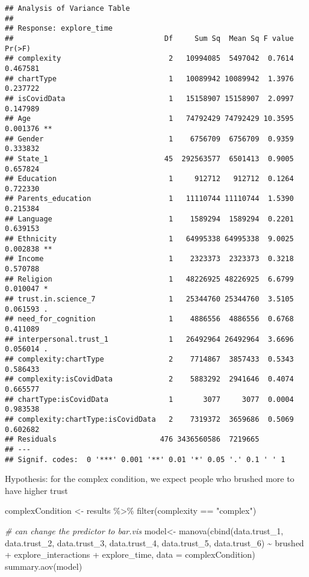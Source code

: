 \documentclass[
]{article}
\newenvironment{Shaded}{\begin{snugshade}}{\end{snugshade}}
\newcommand{\AttributeTok}[1]{\textcolor[rgb]{0.77,0.63,0.00}{#1}}
\newcommand{\CommentTok}[1]{\textcolor[rgb]{0.56,0.35,0.01}{\textit{#1}}}
\newcommand{\FunctionTok}[1]{\textcolor[rgb]{0.00,0.00,0.00}{#1}}
\newcommand{\NormalTok}[1]{#1}
\newcommand{\OtherTok}[1]{\textcolor[rgb]{0.56,0.35,0.01}{#1}}
\newcommand{\SpecialCharTok}[1]{\textcolor[rgb]{0.00,0.00,0.00}{#1}}
\newcommand{\StringTok}[1]{\textcolor[rgb]{0.31,0.60,0.02}{#1}}
\begin{document}
\begin{verbatim}
## Analysis of Variance Table
## 
## Response: explore_time
##                                   Df     Sum Sq  Mean Sq F value   Pr(>F)   
## complexity                         2   10994085  5497042  0.7614 0.467581   
## chartType                          1   10089942 10089942  1.3976 0.237722   
## isCovidData                        1   15158907 15158907  2.0997 0.147989   
## Age                                1   74792429 74792429 10.3595 0.001376 **
## Gender                             1    6756709  6756709  0.9359 0.333832   
## State_1                           45  292563577  6501413  0.9005 0.657824   
## Education                          1     912712   912712  0.1264 0.722330   
## Parents_education                  1   11110744 11110744  1.5390 0.215384   
## Language                           1    1589294  1589294  0.2201 0.639153   
## Ethnicity                          1   64995338 64995338  9.0025 0.002838 **
## Income                             1    2323373  2323373  0.3218 0.570788   
## Religion                           1   48226925 48226925  6.6799 0.010047 * 
## trust.in.science_7                 1   25344760 25344760  3.5105 0.061593 . 
## need_for_cognition                 1    4886556  4886556  0.6768 0.411089   
## interpersonal.trust_1              1   26492964 26492964  3.6696 0.056014 . 
## complexity:chartType               2    7714867  3857433  0.5343 0.586433   
## complexity:isCovidData             2    5883292  2941646  0.4074 0.665577   
## chartType:isCovidData              1       3077     3077  0.0004 0.983538   
## complexity:chartType:isCovidData   2    7319372  3659686  0.5069 0.602682   
## Residuals                        476 3436560586  7219665                    
## ---
## Signif. codes:  0 '***' 0.001 '**' 0.01 '*' 0.05 '.' 0.1 ' ' 1
\end{verbatim}

Hypothesis: for the complex condition, we expect people who brushed more
to have higher trust

\begin{Shaded}
\begin{Highlighting}[]
\NormalTok{complexCondition }\OtherTok{\textless{}{-}}\NormalTok{ results }\SpecialCharTok{\%\textgreater{}\%}
  \FunctionTok{filter}\NormalTok{(complexity }\SpecialCharTok{==} \StringTok{"complex"}\NormalTok{)}

\CommentTok{\# can change the predictor to bar.vis}
\NormalTok{model}\OtherTok{\textless{}{-}} \FunctionTok{manova}\NormalTok{(}\FunctionTok{cbind}\NormalTok{(data.trust\_1, }
\NormalTok{                     data.trust\_2, }
\NormalTok{                     data.trust\_3, }
\NormalTok{                     data.trust\_4, }
\NormalTok{                     data.trust\_5, }
\NormalTok{                     data.trust\_6) }\SpecialCharTok{\textasciitilde{}}\NormalTok{ brushed }\SpecialCharTok{+}\NormalTok{ explore\_interactions }\SpecialCharTok{+}\NormalTok{ explore\_time, }
               \AttributeTok{data =}\NormalTok{ complexCondition)}
\FunctionTok{summary.aov}\NormalTok{(model)}
\end{Highlighting}
\end{Shaded}
\end{document}
